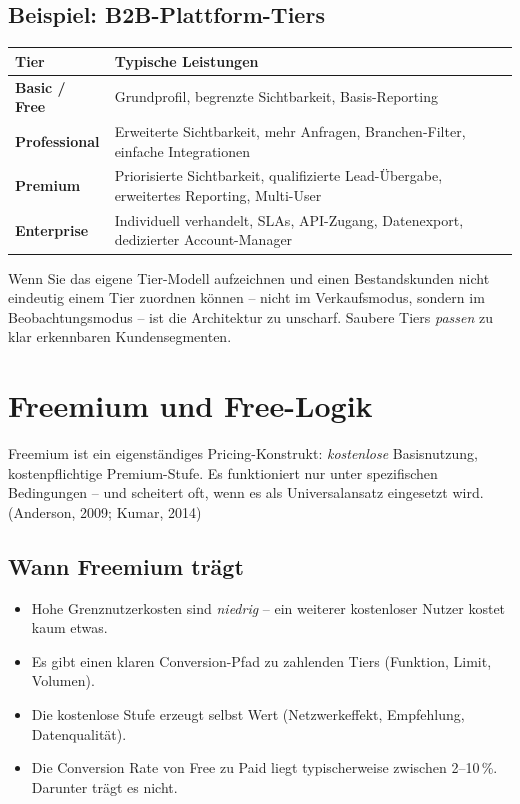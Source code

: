 \documentclass[11pt,a4paper,oneside]{article}
\newcommand{\quelle}[1]{{\footnotesize\color{lpGray}(#1)}}
\begin{document}
\subsection{Beispiel: B2B-Plattform-Tiers}

\begin{tabularx}{\linewidth}{@{}>{\bfseries}lX@{}}
\toprule
Tier & Typische Leistungen \\
\midrule
Basic / Free & Grundprofil, begrenzte Sichtbarkeit, Basis-Reporting \\
Professional & Erweiterte Sichtbarkeit, mehr Anfragen, Branchen-Filter, einfache Integrationen \\
Premium & Priorisierte Sichtbarkeit, qualifizierte Lead-Übergabe, erweitertes Reporting, Multi-User \\
Enterprise & Individuell verhandelt, SLAs, API-Zugang, Datenexport, dedizierter Account-Manager \\
\bottomrule
\end{tabularx}

\begin{merkbox}
Wenn Sie das eigene Tier-Modell aufzeichnen und einen Bestandskunden nicht eindeutig einem Tier zuordnen können -- nicht im Verkaufsmodus, sondern im Beobachtungsmodus -- ist die Architektur zu unscharf. Saubere Tiers \emph{passen} zu klar erkennbaren Kundensegmenten.
\end{merkbox}

\section{Freemium und Free-Logik}

Freemium ist ein eigenständiges Pricing-Konstrukt: \emph{kostenlose} Basisnutzung, kostenpflichtige Premium-Stufe. Es funktioniert nur unter spezifischen Bedingungen -- und scheitert oft, wenn es als Universalansatz eingesetzt wird. \quelle{Anderson, 2009; Kumar, 2014}

\subsection{Wann Freemium trägt}

\begin{itemize}
  \item Hohe Grenznutzerkosten sind \emph{niedrig} -- ein weiterer kostenloser Nutzer kostet kaum etwas.
  \item Es gibt einen klaren Conversion-Pfad zu zahlenden Tiers (Funktion, Limit, Volumen).
  \item Die kostenlose Stufe erzeugt selbst Wert (Netzwerkeffekt, Empfehlung, Datenqualität).
  \item Die Conversion Rate von Free zu Paid liegt typischerweise zwischen 2--10\,\%. Darunter trägt es nicht.
\end{itemize}
\end{document}
